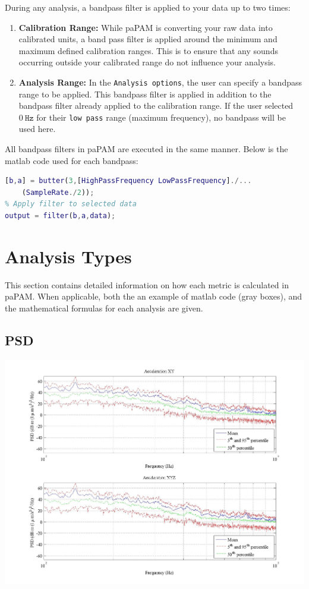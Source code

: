\documentclass[11pt]{report}
\begin{document}
During any analysis, a bandpass filter is applied to your data up to two times:
\begin{enumerate}
\item \textbf{Calibration Range:}  While paPAM is converting your raw data into calibrated units, a band pass filter is applied around the minimum and maximum defined calibration ranges.  This is to ensure that any sounds occurring outside your calibrated range do not influence your analysis.
\item \textbf{Analysis Range:} In the \texttt{Analysis options}, the user can specify a bandpass range to be applied.  This bandpass filter is applied in addition to the bandpass filter already applied to the calibration range.  If the user selected $0 \ \mathtt{Hz}$ for their \texttt{low pass} range (maximum frequency), no bandpass will be used here.
\end{enumerate}
\begin{samepage}
All bandpass filters in paPAM are executed in the same manner.  Below is the matlab code used for each bandpass:

\begin{lstlisting}[style=github, language=MATLAB]
% Define butter filter
[b,a] = butter(3,[HighPassFrequency LowPassFrequency]./...
	(SampleRate./2));
% Apply filter to selected data
output = filter(b,a,data);
\end{lstlisting}
\end{samepage}

\chapter{Analysis Types} \label{AnalysisTypes}

This section contains detailed information on how each metric is calculated in paPAM.  When applicable, both the an example of matlab code (gray boxes), and the mathematical formulas for each analysis are given.

\section{PSD}

\begin{center}
\includegraphics[width = \textwidth ]{7.jpeg}
\end{center}
\end{document}
